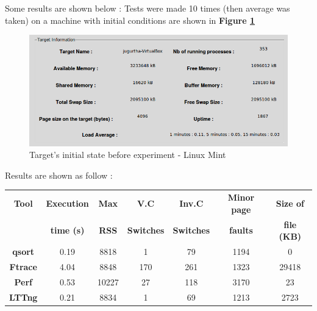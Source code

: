Some results are shown below :
Tests were made 10 times (then average was taken) on a machine with initial conditions are shown in \textbf{Figure \ref{Target's initial state before experiment - Linux Mint}}

     		\begin{figure}[H]
					\centering
        			\includegraphics[scale=0.45]{img/solution/cmptracers-target-information.png}
        			\caption{Target's initial state before experiment - Linux Mint}
        			\label{Target's initial state before experiment - Linux Mint}
   			 \end{figure}
   			 
Results are shown as follow :
						\begin{center}
							\begin{tabular}{|c|c|c|c|c|c|c|}
								\hline
								\textbf{Tool} & \textbf{Execution} & \textbf{Max}  & \textbf{V.C} & \textbf{Inv.C} & \textbf{Minor page} & \textbf{Size of}\\
							& 	\textbf{time (s)} & \textbf{RSS} & \textbf{Switches} & \textbf{Switches} & \textbf{faults} & \textbf{file (KB)} \\
								   	
								\hline
	    						\textbf{qsort} & 0.19 & 8818 & 1 & 79 & 1194 &  0 \\								   		
   								\hline
	    						\textbf{Ftrace} & 4.04 & 8848 & 170 & 261 & 1323 & 29418  \\
								\hline     
        						
   								\textbf{Perf} & 0.53 & 10227 & 27 & 118 & 3170 & 23 \\
   								\hline
   								
   								\textbf{LTTng} & 0.21 & 8834 & 1 & 69 & 1213 & 2723 \\
   								\hline		
							\end{tabular}
						\end{center}


